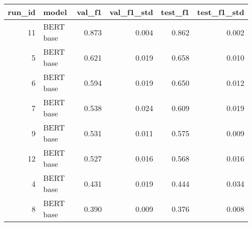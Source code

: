\begin{tabular}{rlrrrr}
\toprule
 run\_id &     model &  val\_f1 &  val\_f1\_std &  test\_f1 &  test\_f1\_std \\
\midrule
     11 & BERT base &   0.873 &       0.004 &    0.862 &        0.002 \\
      5 & BERT base &   0.621 &       0.019 &    0.658 &        0.010 \\
      6 & BERT base &   0.594 &       0.019 &    0.650 &        0.012 \\
      7 & BERT base &   0.538 &       0.024 &    0.609 &        0.019 \\
      9 & BERT base &   0.531 &       0.011 &    0.575 &        0.009 \\
     12 & BERT base &   0.527 &       0.016 &    0.568 &        0.016 \\
      4 & BERT base &   0.431 &       0.019 &    0.444 &        0.034 \\
      8 & BERT base &   0.390 &       0.009 &    0.376 &        0.008 \\
\bottomrule
\end{tabular}
